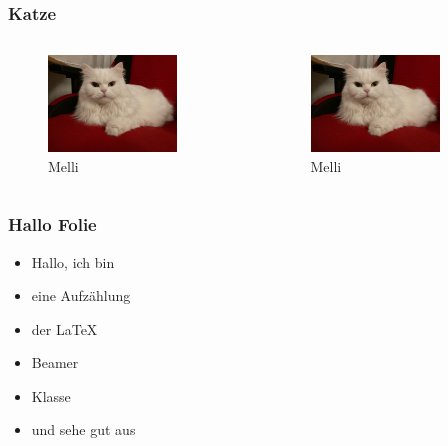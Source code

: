 \documentclass[12pt,ngerman]{beamer}
\begin{document}
\begin{frame}
\frametitle{Katze}
\transdissolve %

\begin{columns}
\begin{column}{0.49\textwidth}
\begin{figure}
\includegraphics[width=0.8\textwidth]{Bilder/Katze}
\caption{Melli}
\end{figure}
\end{column}
\begin{column}{0.49\textwidth}
\begin{figure}
\includegraphics[width=0.8\textwidth]{Bilder/Katze}
\caption{Melli}
\end{figure}
\end{column}

\end{columns}

\end{frame}

\begin{frame}
\frametitle{Hallo Folie}

\begin{itemize}
\item<1-> Hallo, ich bin
\item<2-> eine Aufzählung
\item<3-> der LaTeX
\item<4-> Beamer 
\item<5-> Klasse
\item<6-> und sehe gut aus
\end{itemize}


\end{frame}
\end{document}
